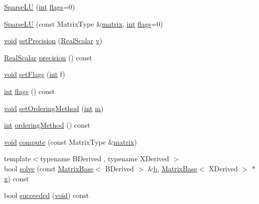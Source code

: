\begin{DoxyCompactItemize}
\item 
\hyperlink{class_sparse_l_u_aa91ed390c852c4945967e928dd48803b}{Sparse\-L\-U} (\hyperlink{ioapi_8h_a787fa3cf048117ba7123753c1e74fcd6}{int} \hyperlink{class_sparse_l_u_a615b2637e9c72a9ae9ceb297f5a200ea}{flags}=0)
\item 
\hyperlink{class_sparse_l_u_a2f719f2a8959aefe1074edda1ffa0a70}{Sparse\-L\-U} (const Matrix\-Type \&\hyperlink{glext_8h_a7b24a3f2f56eb1244ae69dacb4fecb6f}{matrix}, \hyperlink{ioapi_8h_a787fa3cf048117ba7123753c1e74fcd6}{int} \hyperlink{class_sparse_l_u_a615b2637e9c72a9ae9ceb297f5a200ea}{flags}=0)
\item 
\hyperlink{group___u_a_v_objects_plugin_ga444cf2ff3f0ecbe028adce838d373f5c}{void} \hyperlink{class_sparse_l_u_ad43ea425c0b757d8e5f9e2095f052449}{set\-Precision} (\hyperlink{class_sparse_l_u_a1090bc6ec27ebb0b088f6a1bf2ad6eab}{Real\-Scalar} \hyperlink{glext_8h_a14cfbe2fc2234f5504618905b69d1e06}{v})
\item 
\hyperlink{class_sparse_l_u_a1090bc6ec27ebb0b088f6a1bf2ad6eab}{Real\-Scalar} \hyperlink{class_sparse_l_u_ad5f56c5e4c0de8f49af71f940f921fce}{precision} () const 
\item 
\hyperlink{group___u_a_v_objects_plugin_ga444cf2ff3f0ecbe028adce838d373f5c}{void} \hyperlink{class_sparse_l_u_a151bb7c200f5540abeb73c97083359c3}{set\-Flags} (\hyperlink{ioapi_8h_a787fa3cf048117ba7123753c1e74fcd6}{int} f)
\item 
\hyperlink{ioapi_8h_a787fa3cf048117ba7123753c1e74fcd6}{int} \hyperlink{class_sparse_l_u_a615b2637e9c72a9ae9ceb297f5a200ea}{flags} () const 
\item 
\hyperlink{group___u_a_v_objects_plugin_ga444cf2ff3f0ecbe028adce838d373f5c}{void} \hyperlink{class_sparse_l_u_acffbcc0ac58bdbd092053735ecff9ae9}{set\-Ordering\-Method} (\hyperlink{ioapi_8h_a787fa3cf048117ba7123753c1e74fcd6}{int} \hyperlink{glext_8h_af593500c283bf1a787a6f947f503a5c2}{m})
\item 
\hyperlink{ioapi_8h_a787fa3cf048117ba7123753c1e74fcd6}{int} \hyperlink{class_sparse_l_u_aeac863a35f5fd1789bb6204f542af654}{ordering\-Method} () const 
\item 
\hyperlink{group___u_a_v_objects_plugin_ga444cf2ff3f0ecbe028adce838d373f5c}{void} \hyperlink{class_sparse_l_u_aa6d1bdaa3a56c134f320fdfd4de69388}{compute} (const Matrix\-Type \&\hyperlink{glext_8h_a7b24a3f2f56eb1244ae69dacb4fecb6f}{matrix})
\item 
{\footnotesize template$<$typename B\-Derived , typename X\-Derived $>$ }\\bool \hyperlink{class_sparse_l_u_abaffcc4e509351a2316d190eedadf602}{solve} (const \hyperlink{class_matrix_base}{Matrix\-Base}$<$ B\-Derived $>$ \&\hyperlink{glext_8h_a6eba317e3cf44d6d26c04a5a8f197dcb}{b}, \hyperlink{class_matrix_base}{Matrix\-Base}$<$ X\-Derived $>$ $\ast$\hyperlink{glext_8h_a1db9d104e3c2128177f26aff7b46982f}{x}) const 
\item 
bool \hyperlink{class_sparse_l_u_a13d90e525e1e8ad5d4affccad5f025e8}{succeeded} (\hyperlink{group___u_a_v_objects_plugin_ga444cf2ff3f0ecbe028adce838d373f5c}{void}) const 
\end{DoxyCompactItemize}
